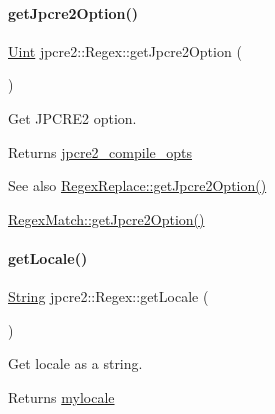 \paragraph{\texorpdfstring{get\+Jpcre2\+Option()}{getJpcre2Option()}}
{\footnotesize\ttfamily \hyperlink{namespacejpcre2_a078242d38221a13fb3543b9edd78c099}{Uint} jpcre2\+::\+Regex\+::get\+Jpcre2\+Option (\begin{DoxyParamCaption}{ }\end{DoxyParamCaption})\hspace{0.3cm}{\ttfamily [inline]}}



Get J\+P\+C\+R\+E2 option. 

\begin{DoxyReturn}{Returns}
\hyperlink{classjpcre2_1_1Regex_abdd26c3bc1c3132f0aa73dde1690a7ef}{jpcre2\+\_\+compile\+\_\+opts} 
\end{DoxyReturn}
\begin{DoxySeeAlso}{See also}
\hyperlink{classjpcre2_1_1RegexReplace_addc36e1c991b639d549a32d1151c04df_addc36e1c991b639d549a32d1151c04df}{Regex\+Replace\+::get\+Jpcre2\+Option()} 

\hyperlink{classjpcre2_1_1RegexMatch_a4ea72774ae5e9a93d649dcb0840efd7f_a4ea72774ae5e9a93d649dcb0840efd7f}{Regex\+Match\+::get\+Jpcre2\+Option()} 
\end{DoxySeeAlso}
\hypertarget{classjpcre2_1_1Regex_ae9afaf627ed922a9e4cee8074d30edfa_ae9afaf627ed922a9e4cee8074d30edfa}{}\label{classjpcre2_1_1Regex_ae9afaf627ed922a9e4cee8074d30edfa_ae9afaf627ed922a9e4cee8074d30edfa} 
\paragraph{\texorpdfstring{get\+Locale()}{getLocale()}}
{\footnotesize\ttfamily \hyperlink{namespacejpcre2_a91f03070152fb228bc116c5a737f1d16}{String} jpcre2\+::\+Regex\+::get\+Locale (\begin{DoxyParamCaption}{ }\end{DoxyParamCaption})\hspace{0.3cm}{\ttfamily [inline]}}



Get locale as a string. 

\begin{DoxyReturn}{Returns}
\hyperlink{classjpcre2_1_1Regex_a92a3ad992cade62d103248302f7e2f2d}{mylocale} 
\end{DoxyReturn}
\hypertarget{classjpcre2_1_1Regex_abb007e99d7e2188ec80b741e7b40668f_abb007e99d7e2188ec80b741e7b40668f}{}\label{classjpcre2_1_1Regex_abb007e99d7e2188ec80b741e7b40668f_abb007e99d7e2188ec80b741e7b40668f} 
